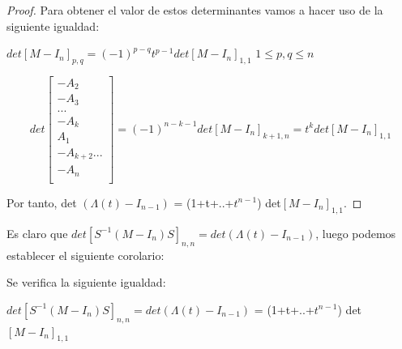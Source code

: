 \documentclass[14pt]{extarticle}
\begin{document}
\begin{lem}
\begin{proof}
	           Para obtener el valor de estos determinantes vamos a hacer uso de la siguiente igualdad:
	           \begin{center}
	           	$ det[M-I_{n}]_{p,q} = (-1)^{p-q}t^{p-1}det[M-I_{n}]_{1,1}	 $ $1\le p,q \le n$  
	           \end{center}         
	           
	           \[det\begin{bmatrix}
	           -A_{2}  \\
	           -A_{3} \\
	           ... \\
	           -A_{k}\\
	           A_{1}\\
	           -A_{k+2}
	           ...\\	
	           - A_{n} \\
	           \end{bmatrix}=(-1)^{n-k-1}det[M-I_{n}]_{k+1,n} = t^{k}det[M-I_{n}]_{1,1}\]
	           
	           Por tanto, det $(\Lambda(t) - I_{n-1})$ = (1+t+..+$ t^{n-1} $) det$[ M - I_{n}] _{1,1} $.
	 \end{proof}
 \end{lem}
 
 Es claro que $ det[S^{-1}(M-I_{n})S]_{n,n} = det(\Lambda(t)-I_{n-1}) $, luego podemos establecer el siguiente corolario:\\
 \begin{cor}\label{corlem}
 		Se verifica la siguiente igualdad:
 		\begin{center}
 			$ det[S^{-1}(M-I_{n})S]_{n,n} = det(\Lambda(t)-I_{n-1}) $ = (1+t+..+$ t^{n-1} $) det$[ M - I_{n}] _{1,1} $
 		\end{center}
 \end{cor}
 
\end{document}
